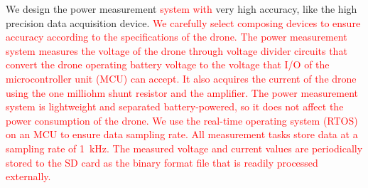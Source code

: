 \documentclass[journal]{./template/IEEEtran}
\begin{document}

We design the power measurement \textcolor{red}{system with} very high accuracy, like the high precision data acquisition device.
\textcolor{red}{We carefully select composing devices to ensure accuracy according to the specifications of the drone.
The power measurement system measures the voltage of the drone through voltage divider circuits that convert the drone operating battery voltage to the voltage that I/O of the microcontroller unit (MCU) can accept.  
It also acquires the current of the drone using the one milliohm shunt resistor and the amplifier.
The power measurement system is lightweight and separated battery-powered, so it does not affect the power consumption of the drone.
We use the real-time operating system (RTOS) on an MCU to ensure data sampling rate.
All measurement tasks store data at a sampling rate of 1~kHz.
The measured voltage and current values are periodically stored to the SD card as the binary format file that is readily processed externally.} 
\end{document}
